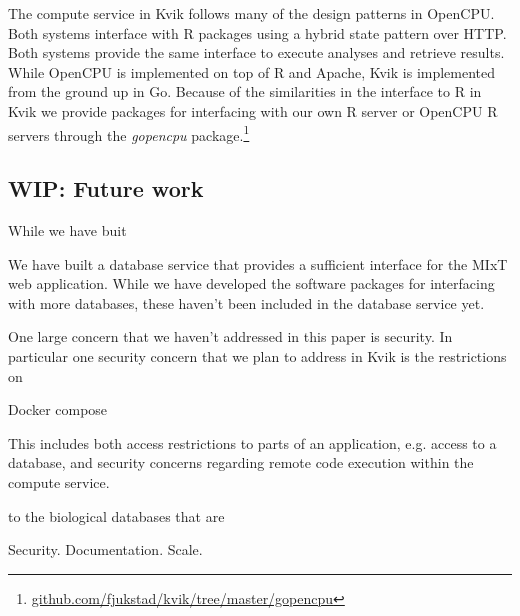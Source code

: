 The compute service in Kvik follows many of the design patterns in
OpenCPU. Both systems interface with R packages using a hybrid state pattern
over HTTP. Both systems provide the same interface to execute analyses and
retrieve results.  While OpenCPU is implemented on top of R and Apache, Kvik is
implemented from the ground up in Go. Because of the similarities in the
interface to R in Kvik we provide packages for interfacing with our own R server
or OpenCPU R servers through the
\emph{gopencpu} package.\footnote{\url{github.com/fjukstad/kvik/tree/master/gopencpu}} 


\subsection*{WIP: Future work} 
While we have buit 

We have built a database service that provides a sufficient interface for the
MIxT web application. While we have developed the software packages for
interfacing with more databases, these haven't been included in the database
service yet. 

One large concern that we haven't addressed in this paper is security. In
particular one security concern that we plan to address in Kvik is the
restrictions on 

Docker compose 

This
includes both access restrictions to parts of an application, e.g. access to a
database, and security concerns regarding remote code execution within the
compute service. 

to the 
biological databases that are 

Security.
Documentation.
Scale. 
